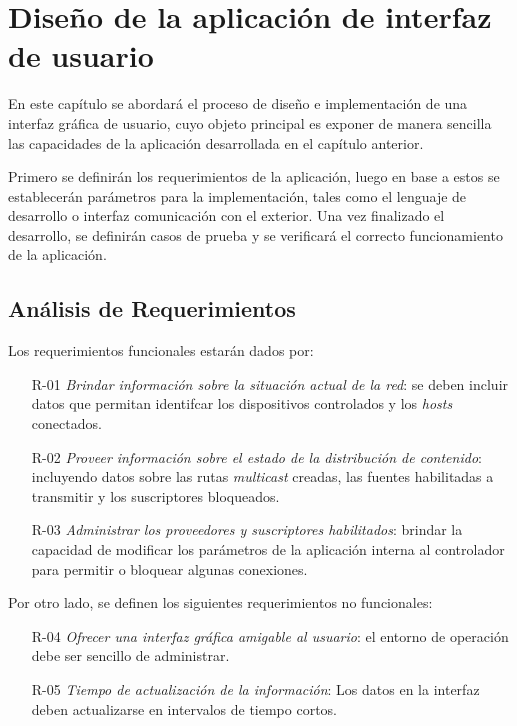 
\chapter{Diseño de la aplicación de interfaz de usuario} %

\label{Chapter6} %
 En este capítulo se abordará el proceso de diseño e implementación de una interfaz gráfica de usuario, cuyo objeto principal es exponer de manera sencilla las capacidades de la aplicación desarrollada en el capítulo anterior. \


 Primero se definirán los requerimientos de la aplicación, luego en base a estos se establecerán parámetros para la implementación, tales como el lenguaje de desarrollo o interfaz comunicación con el exterior.
 Una vez finalizado el desarrollo, se definirán casos de prueba y se verificará el correcto funcionamiento de la aplicación.

\section{Análisis de Requerimientos}
Los requerimientos funcionales estarán dados por:
\begin{itemize}
    \item [R-01] \textit{Brindar información sobre la situación actual de la red}: se deben incluir datos que permitan identifcar los dispositivos controlados y los \textit{hosts} conectados.
    \item [R-02] \textit{Proveer información sobre el estado de la distribución de contenido}: incluyendo datos sobre las rutas \textit{multicast} creadas, las fuentes habilitadas a transmitir y los suscriptores bloqueados.
    \item [R-03] \textit{Administrar los proveedores y suscriptores habilitados}: brindar la capacidad de modificar los parámetros de la aplicación interna al controlador para permitir o bloquear algunas conexiones.
\end{itemize}


Por otro lado, se definen los siguientes requerimientos no funcionales:
\begin{itemize}
    \item [R-04] \textit{Ofrecer una interfaz gráfica amigable al usuario}: el entorno de operación debe ser sencillo de administrar.
    \item [R-05] \textit{Tiempo de actualización de la información}: Los datos en la interfaz deben actualizarse en intervalos de tiempo cortos.
\end{itemize}

